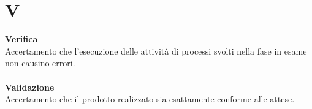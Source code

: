 \section{V}
\textbf{Verifica}\\
Accertamento che l’esecuzione delle attività di processi svolti nella fase in esame non causino errori. \\ \\
\textbf{Validazione}\\
Accertamento che il prodotto realizzato sia esattamente conforme alle attese. \\ \\